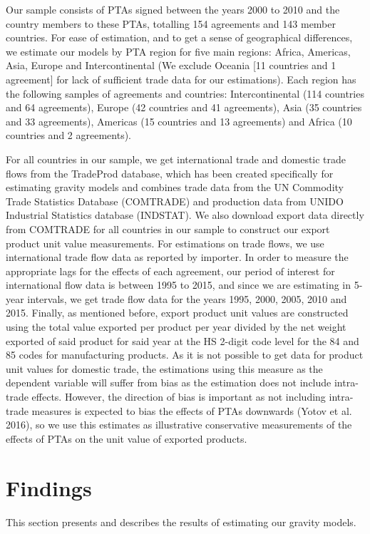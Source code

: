 \documentclass[12pt]{article}%
\begin{document}
Our sample consists of PTAs signed between the years 2000 to 2010 and
the country members to these PTAs, totalling 154 agreements and 143
member countries. For ease of estimation, and to get a sense of
geographical differences, we estimate our models by PTA region for five
main regions: Africa, Americas, Asia, Europe and Intercontinental (We
exclude Oceania {[}11 countries and 1 agreement{]} for lack of
sufficient trade data for our estimations). Each region has the
following samples of agreements and countries: Intercontinental (114
countries and 64 agreements), Europe (42 countries and 41 agreements),
Asia (35 countries and 33 agreements), Americas (15 countries and 13
agreements) and Africa (10 countries and 2 agreements).

For all countries in our sample, we get international trade and domestic
trade flows from the TradeProd database, which has been created
specifically for estimating gravity models and combines trade data from
the UN Commodity Trade Statistics Database (COMTRADE) and production
data from UNIDO Industrial Statistics database (INDSTAT). We also
download export data directly from COMTRADE for all countries in our
sample to construct our export product unit value measurements. For
estimations on trade flows, we use international trade flow data as
reported by importer. In order to measure the appropriate lags for the
effects of each agreement, our period of interest for international flow
data is between 1995 to 2015, and since we are estimating in 5-year
intervals, we get trade flow data for the years 1995, 2000, 2005, 2010
and 2015. Finally, as mentioned before, export product unit values are
constructed using the total value exported per product per year divided
by the net weight exported of said product for said year at the HS
2-digit code level for the 84 and 85 codes for manufacturing products.
As it is not possible to get data for product unit values for domestic
trade, the estimations using this measure as the dependent variable will
suffer from bias as the estimation does not include intra-trade effects.
However, the direction of bias is important as not including intra-trade
measures is expected to bias the effects of PTAs downwards (Yotov et al.
2016), so we use this estimates as illustrative conservative
measurements of the effects of PTAs on the unit value of exported
products.

%
\section{Findings}%
\label{sec:Findings}%
This section presents and describes the results of estimating our gravity models.
\end{document}
